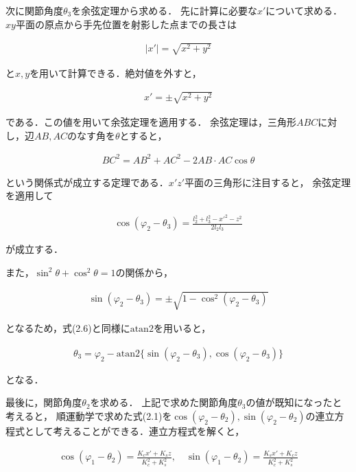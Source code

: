次に関節角度$\theta_3$を余弦定理から求める．
先に計算に必要な$x'$について求める．
$xy$平面の原点から手先位置を射影した点までの長さは

\begin{align}
  |x'| = \sqrt{x^2 + y^2} \tag{2.7}
\end{align}

と$x, y$を用いて計算できる．絶対値を外すと，

\begin{align}
  x' = \pm \sqrt{x^2 + y^2} \tag{2.8}
\end{align}

である．この値を用いて余弦定理を適用する．
余弦定理は，三角形$ABC$に対し，辺$AB, AC$のなす角を$\theta$とすると，

\begin{align}
  BC^2 = AB^2 + AC^2 - 2 AB \cdot AC \cos \theta \tag{2.9}
\end{align}

という関係式が成立する定理である．$x'z'$平面の三角形に注目すると，
余弦定理を適用して

\begin{align}
  \cos(\varphi_2 - \theta_3) = \frac{l_2^2 + l_3^2 - x'^2 - z^2}{2 l_2 l_3} \tag{2.10}
\end{align}

が成立する．

また，$\sin^2 \theta + \cos^2 \theta = 1$の関係から，

\begin{align}
  \sin(\varphi_2 - \theta_3) = \pm \sqrt{1 - \cos^2 (\varphi_2 - \theta_3)} \tag{2.11}
\end{align}

となるため，式(2.6)と同様に$\text{atan2}$を用いると，

\begin{align}
  \theta_3 = \varphi_2 - \text{atan2} \{ \sin(\varphi_2 - \theta_3), \cos(\varphi_2 - \theta_3) \} \tag{2.12}
\end{align}

となる．

最後に，関節角度$\theta_2$を求める．
上記で求めた関節角度$\theta_3$の値が既知になったと考えると，
順運動学で求めた式(2.1)を$\cos(\varphi_2 - \theta_2), \sin(\varphi_2 - \theta_2)$の連立方程式として考えることができる．連立方程式を解くと，

\begin{align}
  \cos(\varphi_1 - \theta_2) = \frac{K_c x' + K_s z}{K_c^2 + K_s^2}, \quad \sin(\varphi_1 - \theta_2) = \frac{K_s x' + K_c z}{K_c^2 + K_s^2} \tag{2.13}
\end{align}


